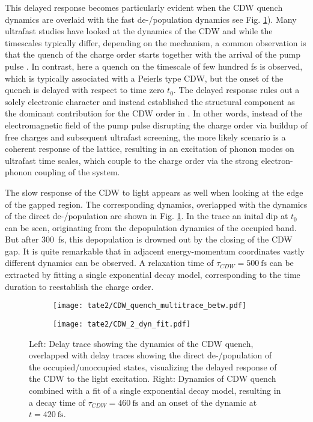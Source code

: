 This delayed response becomes particularly evident when the CDW quench dynamics are overlaid with the fast de-/population dynamics see Fig. \ref{fig:TaTe_CDW_comp}).
Many ultrafast studies have looked at the dynamics of the CDW and while the timescales typically differ, depending on the mechanism, a common observation is that the quench of the charge order starts together with the arrival of the pump pulse \cite{perfetti_time_2006, rohwer_collapse_2011, rettig_coherent_2014, shi_ultrafast_2019, maklar_nonequilibrium_2021, maklar_coherent_2022, huber_mapping_2022, huber_revealing_2022, maklar_coherent_2023, huber_ultrafast_2024}.
In contrast, here a quench on the timescale of few hundred \unit{\femto\second} is observed, which is typically associated with a Peierls type CDW, but the onset of the quench is delayed with respect to time zero $t_0$.
The delayed response rules out a solely electronic character and instead established the structural component as the dominant contribution for the CDW order in .
In other words, instead of the electromagnetic field of the pump pulse disrupting the charge order via buildup of free charges and subsequent ultrafast screening, the more likely scenario is a coherent response of the lattice, resulting in an excitation of phonon modes on ultrafast time scales, which couple to the charge order via the strong electron-phonon coupling of the system.

The slow response of the CDW to light appears as well when looking at the edge of the gapped region.
The corresponding dynamics, overlapped with the dynamics of the direct de-/population are shown in Fig. \ref{fig:TaTe_CDW_comp}.
In the trace an inital dip at $t_0$ can be seen, originating from the depopulation dynamics of the occupied band.
But after \qty{300}{\femto\second}, this depopulation is drowned out by the closing of the CDW gap.
It is quite remarkable that in adjacent energy-momentum coordinates vastly different dynamics can be observed.
A relaxation time of $\tau_{CDW}=\qty{500}{\femto\second}$ can be extracted by fitting a single exponential decay model, corresponding to the time duration to reestablish the charge order.

\begin{figure}[t!]
	\centering
	\begin{subfigure}[b]{0.33\textwidth}
		\texttt{[image: tate2/CDW\_quench\_multitrace\_betw.pdf]}
		\caption{}
	\end{subfigure}
	\begin{subfigure}[b]{0.33\textwidth}
		\texttt{[image: tate2/CDW\_2\_dyn\_fit.pdf]}
		\caption{}
	\end{subfigure}
	\caption{Left: Delay trace showing the dynamics of the CDW quench, overlapped with delay traces showing the direct de-/population of the occupied/unoccupied states, visualizing the delayed response of the CDW to the light excitation. Right: Dynamics of CDW quench combined with a fit of a single exponential decay model, resulting in a decay time of $\tau_{CDW}=\qty{460}{\femto\second}$ and an onset of the dynamic at $t=\qty{420}{\femto\second}$.}
	\label{fig:TaTe_CDW_comp}
\end{figure}

